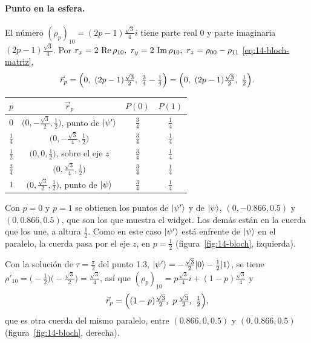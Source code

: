 \paragraph{Punto en la esfera.} El número $(\rho_p)_{10}=(2p-1)\frac{\sqrt3}{4}i$ tiene parte real
$0$ y parte imaginaria $(2p-1)\frac{\sqrt3}{4}$. Por
$r_x=2\,\Real\rho_{10},\ r_y=2\,\Imag\rho_{10},\ r_z=\rho_{00}-\rho_{11}$ \eqref{eq:14-bloch-matriz},
\[
  \vec r_p=\Bigl(0,\ (2p-1)\tfrac{\sqrt3}{2},\ \tfrac34-\tfrac14\Bigr)
          =\Bigl(0,\ (2p-1)\tfrac{\sqrt3}{2},\ \tfrac12\Bigr).
\]
\begin{center}
\renewcommand{\arraystretch}{1.45}
\begin{tabular}{cccc}
  $p$ & $\vec r_p$ & $P(0)$ & $P(1)$\\\hline
  $0$ & $\bigl(0,-\frac{\sqrt3}{2},\frac12\bigr)$, punto de $\lvert \psi'\rangle$ & $\frac34$ & $\frac14$\\
  $\frac14$ & $\bigl(0,-\frac{\sqrt3}{4},\frac12\bigr)$ & $\frac34$ & $\frac14$\\
  $\frac12$ & $\bigl(0,0,\frac12\bigr)$, sobre el eje $z$ & $\frac34$ & $\frac14$\\
  $\frac34$ & $\bigl(0,\frac{\sqrt3}{4},\frac12\bigr)$ & $\frac34$ & $\frac14$\\
  $1$ & $\bigl(0,\frac{\sqrt3}{2},\frac12\bigr)$, punto de $\lvert \psi\rangle$ & $\frac34$ & $\frac14$
\end{tabular}
\end{center}
Con $p=0$ y $p=1$ se obtienen los puntos de $\lvert \psi'\rangle$ y de $\lvert \psi\rangle$,
$(0,-0.866,0.5)$ y $(0,0.866,0.5)$, que son los que muestra el widget. Los demás están en la
cuerda que los une, a altura $\frac12$. Como en este caso $\lvert \psi'\rangle$ está enfrente de
$\lvert \psi\rangle$ en el paralelo, la cuerda pasa por el eje $z$, en $p=\frac12$ (figura~\ref{fig:14-bloch},
izquierda).

Con la solución de $\tau=\frac\pi2$ del punto 1.3, $\lvert \psi'\rangle=-\frac{\sqrt3}{2}\lvert 0\rangle-\frac12\lvert 1\rangle$,
se tiene $\rho'_{10}=\bigl(-\frac12\bigr)\bigl(-\frac{\sqrt3}{2}\bigr)=\frac{\sqrt3}{4}$, así que
$(\rho_p)_{10}=p\frac{\sqrt3}{4}i+(1-p)\frac{\sqrt3}{4}$ y
\[
  \vec r_p=\Bigl((1-p)\tfrac{\sqrt3}{2},\ p\,\tfrac{\sqrt3}{2},\ \tfrac12\Bigr),
\]
que es otra cuerda del mismo paralelo, entre $(0.866,0,0.5)$ y $(0,0.866,0.5)$
(figura~\ref{fig:14-bloch}, derecha).


